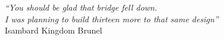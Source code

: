 \cleardoublepage
\thispagestyle{plain}

\vspace*{8cm}

\begin{flushright}
   \textsl{``You should be glad that bridge fell down. \\
           I was planning to build thirteen more to that same design''} \\
\vspace*{1.5cm}
           Isambard Kingdom Brunel
\end{flushright}
